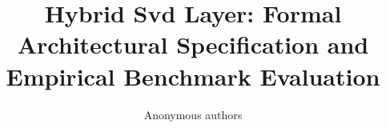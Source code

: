 \title{\textbf{Hybrid Svd Layer: Formal Architectural Specification and Empirical Benchmark Evaluation}}

\author{Anonymous authors}
